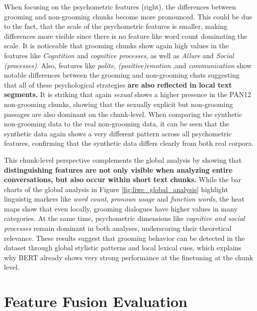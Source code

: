 When focusing on the psychometric features (right), the differences between grooming and non-grooming chunks become more pronounced. This could be due to the fact, that the scale of the psychometric features is smaller, making differences more visible since there is no feature like word count dominating the scale. It is noticeable that grooming chunks show again high values in the features like \textit{Cogntition} and \textit{cognitive processes}, as well as \textit{Allure} and \textit{Social (processes)}. Also, features like \textit{polite}, \textit{(positive)emotion} ,and \textit{communication} show notable differences between the grooming and non-grooming chats suggesting that all of these psychological strategies \textbf{are also reflected in local text segments.} It is striking that again \textit{sexual} shows a higher presence in the PAN12 non-grooming chunks, showing that the sexually explicit but non-grooming passages are also dominant on the chunk-level. When comparing the synthetic non-grooming data to the real non-grooming data, it can be seen that the synthetic data again shows a very different pattern across all psychometric features, confirming that the synthetic data differs clearly from both real corpora. 

This chunk-level perspective complements the global analysis by showing that \textbf{distinguishing features are not only visible when analyzing entire conversations, but also occur within short text chunks.} While the bar charts of the global analysis in Figure \ref{fig:liwc_global_analysis} highlight linguistig markers like \textit{word count}, \textit{pronoun usage} and \textit{function words}, the heat maps show that even locally, grooming dialogues have higher values in many categories. At the same time, psychometric dimensions like \textit{cognitive and social processes} remain dominant in both analyses, underscoring their theoretical relevance. These results suggest that grooming behavior can be detected in the dataset through global stylistic patterns and local lexical cues, which explains why BERT already shows very strong performance at the finetuning at the chunk level.

\section{Feature Fusion Evaluation}




